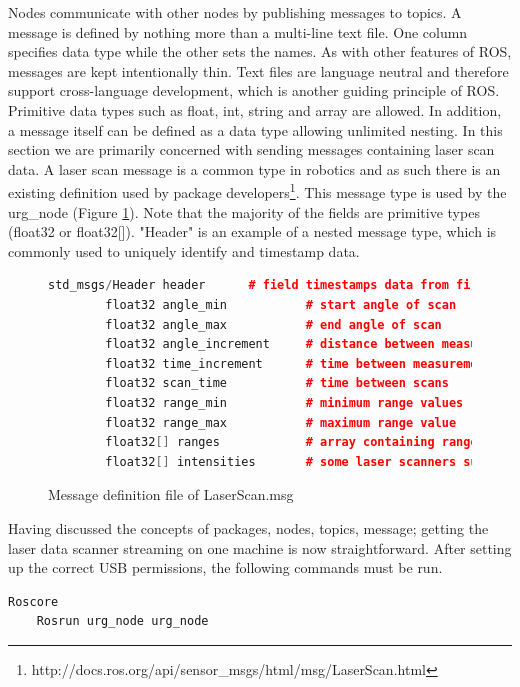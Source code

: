 \documentclass[capstone_report.tex]{subfiles}
\begin{document}
Nodes communicate with other nodes by publishing messages to topics.
A message is defined by nothing more than a multi-line text file.  One column specifies data type while the other sets the names.  As with other features of ROS, messages are kept intentionally thin.  Text files are language neutral and therefore support cross-language development, which is another guiding principle of ROS.  Primitive data types such as float, int, string and array are allowed.  In addition, a message itself can be defined as a data type allowing unlimited nesting.  In this section we are primarily concerned with sending messages containing laser scan data.  A laser scan message is a common type in robotics and as such there is an existing definition used by package developers\footnote{http://docs.ros.org/api/sensor\_msgs/html/msg/LaserScan.html}.  This message type is used by the urg\_node (Figure \ref{fig:message}).  Note that the majority of the fields are primitive types (float32 or float32[]).  "Header" is an example of a nested message type, which is commonly used to uniquely identify and timestamp data.

\begin{figure}[H]
    \begin{lstlisting}[language=c++]
        std_msgs/Header header      # field timestamps data from first ray in scan
        float32 angle_min           # start angle of scan
        float32 angle_max           # end angle of scan
        float32 angle_increment     # distance between measurements
        float32 time_increment      # time between measurements 
        float32 scan_time           # time between scans
        float32 range_min           # minimum range values
        float32 range_max           # maximum range value
        float32[] ranges            # array containing ranges
        float32[] intensities       # some laser scanners support intensity readings
    \end{lstlisting}
    \caption{Message definition file of LaserScan.msg}
    \label{fig:message}
\end{figure}

Having discussed the concepts of packages, nodes, topics, message;
getting the laser data scanner streaming on one machine is now straightforward.  After setting up the correct USB permissions, the following commands must be run.

\begin{lstlisting}[language=bash]
    Roscore
    Rosrun urg_node urg_node
\end{lstlisting}
\end{document}

